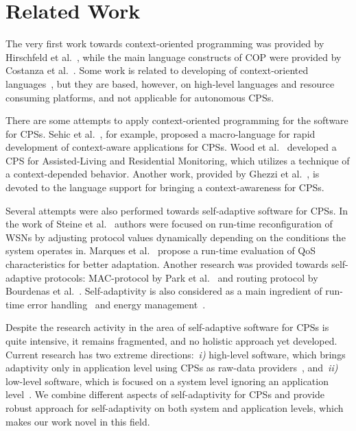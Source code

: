 \section{Related Work}
\label{sec:related}

The very first work towards context-oriented programming was provided by
Hirschfeld et al.~\cite{Hirschfeld08}, while the main language constructs of COP
were provided by Costanza et al.~\cite{Costanza11}. Some work is related to
developing of context-oriented languages~\cite{Sehic11,Kamina11,Bardram05},
but they are based, however, on high-level languages and resource consuming
platforms, and not applicable for autonomous CPSs.

There are some attempts to apply context-oriented programming for the software
for CPSs. Sehic et al.~\cite{Sehic11}, for example, proposed a macro-language
for rapid development of context-aware applications for CPSs. Wood et
al.~\cite{Wood08} developed a CPS for Assisted-Living and Residential
Monitoring, which utilizes a technique of a context-depended behavior. Another
work, provided by Ghezzi et al.~\cite{Ghezzi10}, is devoted to the language
support for bringing a context-awareness for CPSs.

Several attempts were also performed towards self-adaptive software for CPSs. In
the work of Steine et al.~\cite{Steine11} authors were focused on run-time
reconfiguration of WSNs by adjusting protocol values dynamically depending on
the conditions the system operates in. Marques et al.~\cite{Marques11} propose a
run-time evaluation of QoS characteristics for better adaptation. Another
research was provided towards self-adaptive protocols: MAC-protocol by Park et
al.~\cite{Park08} and routing protocol by Bourdenas et al.~\cite{Bourdenas11}.
Self-adaptivity is also considered as a main ingredient of run-time error
handling~\cite{Bourdenas10} and energy management~\cite{Jiang07}.

Despite the research activity in the area of self-adaptive software for CPSs is
quite intensive, it remains fragmented, and no holistic approach yet developed.
Current research has two extreme directions:~\emph{i)} high-level software,
which brings adaptivity only in application level using CPSs as raw-data
providers~\cite{Wood08,Sehic11,Ghezzi10}, and~\emph{ii)} low-level software,
which is focused on a system level ignoring an application
level~\cite{Steine11,Marques11,Park08,Bourdenas11,Bourdenas10,Jiang07}.
We combine different aspects of self-adaptivity for CPSs and provide robust
approach for self-adaptivity on both system and application levels, which makes
our work novel in this field.

